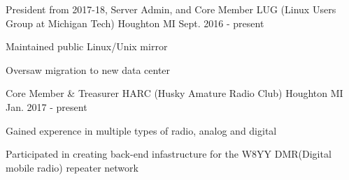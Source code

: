 

\begin{cventries}

  \cventry
    {President from 2017-18, Server Admin, and Core Member} %
    {LUG (Linux Users Group at Michigan Tech)} %
    {Houghton MI} %
    {Sept. 2016 - present} %
    {
      \begin{cvitems} %
        \item {Maintained public Linux/Unix mirror}
        \item {Oversaw migration to new data center}
      \end{cvitems}
    }

  \cventry
    {Core Member \& Treasurer} %
    {HARC (Husky Amature Radio Club)} %
    {Houghton MI} %
    {Jan. 2017 - present} %
    {
      \begin{cvitems} %
        \item {Gained experence in multiple types of radio, analog and digital}
        \item {Participated in creating back-end infastructure for the W8YY DMR(Digital mobile radio) repeater network}
      \end{cvitems}
    }





\end{cventries}
